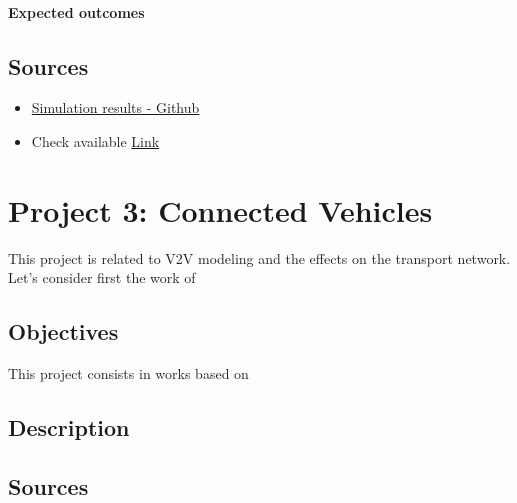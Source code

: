 \documentclass[]{book}
\theoremstyle{definition}
\theoremstyle{definition}
\theoremstyle{definition}
\theoremstyle{remark}
\begin{document}
\hypertarget{expected-outcomes-7}{%
\subsubsection*{Expected outcomes}\label{expected-outcomes-7}}

\hypertarget{sources-1}{%
\section*{Sources}\label{sources-1}}

\begin{itemize}
\item
  \href{https://github.com/aladinoster/density-reconstruction}{Simulation
  results - Github}
\item
  Check \autocite{Duret2019} available
  \href{http://bit.ly/Hierarchical_ISTTT}{Link}
\end{itemize}

\hypertarget{project-3-connected-vehicles}{%
\chapter{Project 3: Connected
Vehicles}\label{project-3-connected-vehicles}}

This project is related to V2V modeling and the effects on the transport
network. Let's consider first the work of

\hypertarget{objectives-2}{%
\section*{Objectives}\label{objectives-2}}

This project consists in works based on \autocite{Grandinetti2015}

\hypertarget{description-2}{%
\section*{Description}\label{description-2}}

\hypertarget{sources-2}{%
\section*{Sources}\label{sources-2}}
\end{document}

